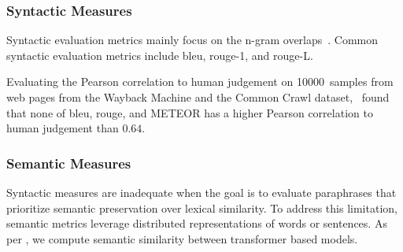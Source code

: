 

\subsubsection{Syntactic Measures}
Syntactic evaluation metrics mainly focus on the n-gram overlaps~\citep{zhou_paraphrase_2021}. 
Common syntactic evaluation metrics include \acs{bleu}, \acs{rouge}-1, and \acs{rouge}-L.





Evaluating the Pearson correlation to human judgement on \num{10000}~samples from web pages from the Wayback Machine and the Common Crawl dataset, \citet{anantha_pearson_metrics_2021}\ found that none of \ac{bleu}, \ac{rouge}, and METEOR has a higher Pearson correlation to human judgement than $0.64$.


\subsubsection{Semantic Measures}
Syntactic measures are inadequate when the goal is to evaluate paraphrases that prioritize semantic preservation over lexical similarity. 
To address this limitation, semantic metrics leverage distributed representations of words or sentences.
As per \citet{gohsen_captions_2023}, we compute semantic similarity between transformer based models.

